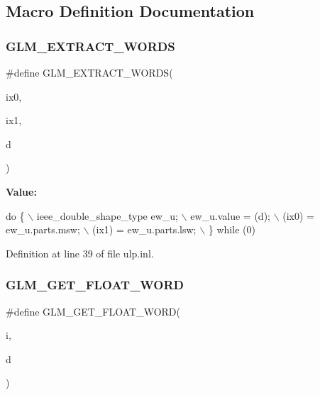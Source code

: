 \subsection{Macro Definition Documentation}
\mbox{\label{ulp_8inl_a037d712bb7eec79dcd0073eb07d3f3e8}} 
\subsubsection{\texorpdfstring{G\+L\+M\+\_\+\+E\+X\+T\+R\+A\+C\+T\+\_\+\+W\+O\+R\+DS}{GLM\_EXTRACT\_WORDS}}
{\footnotesize\ttfamily \#define G\+L\+M\+\_\+\+E\+X\+T\+R\+A\+C\+T\+\_\+\+W\+O\+R\+DS(\begin{DoxyParamCaption}\item[{}]{ix0,  }\item[{}]{ix1,  }\item[{}]{d }\end{DoxyParamCaption})}

{\bfseries Value\+:}
\begin{DoxyCode}
\textcolor{keywordflow}{do} \{                                    \(\backslash\)
        ieee\_double\_shape\_type ew\_u;        \(\backslash\)
        ew\_u.value = (d);                   \(\backslash\)
        (ix0) = ew\_u.parts.msw;             \(\backslash\)
        (ix1) = ew\_u.parts.lsw;             \(\backslash\)
    \} \textcolor{keywordflow}{while} (0)
\end{DoxyCode}


Definition at line 39 of file ulp.\+inl.

\mbox{\label{ulp_8inl_a28d9056369280955e923f99180ccb23c}} 
\subsubsection{\texorpdfstring{G\+L\+M\+\_\+\+G\+E\+T\+\_\+\+F\+L\+O\+A\+T\+\_\+\+W\+O\+RD}{GLM\_GET\_FLOAT\_WORD}}
{\footnotesize\ttfamily \#define G\+L\+M\+\_\+\+G\+E\+T\+\_\+\+F\+L\+O\+A\+T\+\_\+\+W\+O\+RD(\begin{DoxyParamCaption}\item[{}]{i,  }\item[{}]{d }\end{DoxyParamCaption})}

